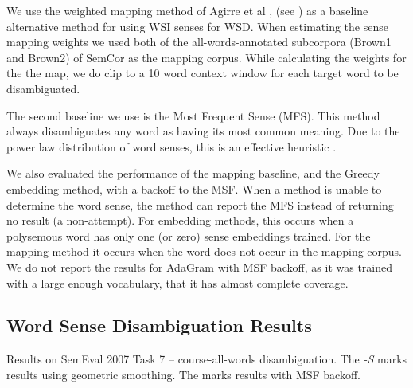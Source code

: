 \documentclass{sig-alternate}
\begin{document}
We use the weighted mapping method of Agirre et al \parencite{agirre2006}, (see ) as a baseline alternative method for using WSI senses for WSD.
When estimating the sense mapping weights we used both of the all-words-annotated subcorpora (Brown1 and Brown2) of SemCor as the mapping corpus.
While calculating the weights for the the map, we do clip to a 10 word context window for each target word to be disambiguated.

The second baseline we use is the Most Frequent Sense (MFS). This method always disambiguates any word as having its  most common meaning. Due to the power law distribution of word senses, this is an effective heuristic \parencite{Kilgarriff2004}.

We also evaluated the performance of the mapping baseline, and the Greedy embedding method, with a backoff to the MSF. When a method is unable to determine the word sense, the method can report the MFS instead of returning no result (a non-attempt). For embedding methods, this occurs when a polysemous word has only one (or zero) sense embeddings trained. For the mapping method it occurs when the word does not occur in the mapping corpus. We do not report the results for AdaGram with MSF backoff, as it was trained with a large enough vocabulary, that it has almost complete coverage.

\subsection{Word Sense Disambiguation Results} \label{WSDtask}
\begin{table}
	\begin{adjustbox}{max width=\columnwidth}
	\end{adjustbox}

	\caption{Results on SemEval 2007 Task 7 -- course-all-words disambiguation.
	The \emph{-S} marks results using geometric smoothing.
	The \emph{\textasteriskcentered } marks results with MSF backoff.
	} \label{samevalres}
\end{table}
\end{document}
